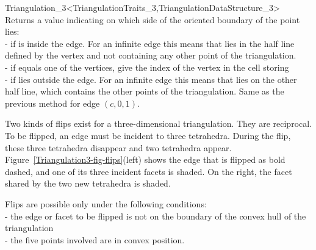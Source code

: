 \begin{ccRefClass}{Triangulation_3<TriangulationTraits_3,TriangulationDataStructure_3>}
{Returns a value indicating on which side of the oriented boundary
of  the point  lies:\\
-  if  is inside the edge. For an
infinite edge this means that  lies in the half line defined by
the vertex and not containing any other point of the triangulation.\\ 
-  if  equals one of the vertices,
 give the index of the vertex in the cell storing \\
-  if  lies outside the edge. For
an infinite edge this means that  lies on the other half line,
which contains the other points of the triangulation.
}
\ccGlue
{}
{Same as the previous method for edge $(c,0,1)$.}


Two kinds of flips exist for a three-dimensional triangulation. They
are reciprocal. To be flipped, an edge must be incident to three
tetrahedra. During the flip, these three tetrahedra disappear and two
tetrahedra appear. Figure~\ref{Triangulation3-fig-flips}(left) shows the
edge that is flipped as bold dashed, and one of its three incident
facets is shaded. On the right, the facet shared by the two new
tetrahedra is shaded. 

Flips are possible only under the following conditions:\\
- the edge or facet to be flipped is not on the boundary of the convex
hull of the triangulation \\
- the five points involved are in convex position.


\end{ccRefClass}
